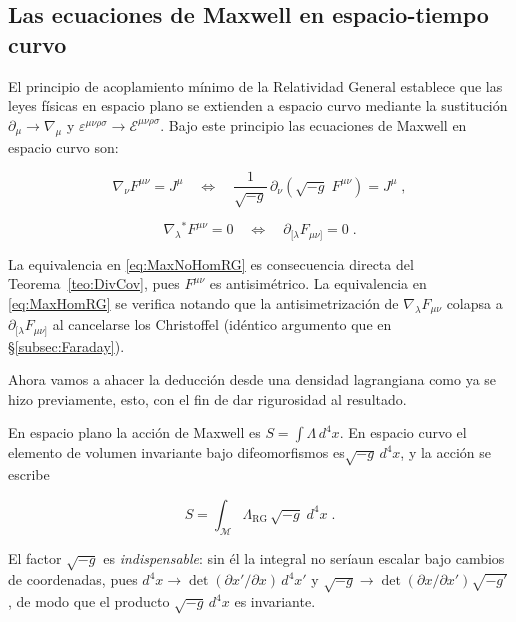         \subsection{Las ecuaciones de Maxwell en espacio-tiempo curvo}\label{subsec:MaxwellCurvo}

            El principio de acoplamiento mínimo de la Relatividad General establece que las leyes físicas en espacio plano se extienden a espacio curvo mediante la sustitución $\partial_{\mu}\to\nabla_{\mu}$ y $\varepsilon^{\mu\nu\rho\sigma} \to\mathcal{E}^{\mu\nu\rho\sigma}$.  Bajo este principio las ecuaciones de Maxwell en espacio curvo son:

            \begin{equation}\label{eq:MaxNoHomRG}
                \nabla_{\nu}F^{\mu\nu} = J^{\mu}
                \quad\Longleftrightarrow\quad
                \frac{1}{\sqrt{-g}}\,\partial_{\nu}
                \!\left(\sqrt{-g}\;F^{\mu\nu}\right) = J^{\mu}\;,
            \end{equation}

            \begin{equation}\label{eq:MaxHomRG}
                \nabla_{\lambda}{}^{*}F^{\mu\nu} = 0
                \quad\Longleftrightarrow\quad
                \partial_{[\lambda}F_{\mu\nu]} = 0\;.
            \end{equation}

            La equivalencia en \eqref{eq:MaxNoHomRG} es consecuencia directa del Teorema~\ref{teo:DivCov}, pues $F^{\mu\nu}$ es antisimétrico.  La equivalencia en \eqref{eq:MaxHomRG} se verifica notando que la antisimetrización de $\nabla_{\lambda}F_{\mu\nu}$ colapsa a $\partial_{[\lambda}F_{\mu\nu]}$ al cancelarse los Christoffel (idéntico argumento que en \S\ref{subsec:Faraday}).

            Ahora vamos a ahacer la deducción desde una densidad lagrangiana como ya se hizo previamente, esto, con el fin de dar rigurosidad al resultado.

            En espacio plano la acción de Maxwell es $S=\int\Lambda\,d^4x$. En espacio curvo el elemento de volumen invariante bajo difeomorfismos es$\sqrt{-g}\,d^4x$, y la acción se escribe

            \begin{equation}\label{eq:AccionRG}
                S = \int_{\mathcal{M}}\Lambda_{\text{RG}}\,\sqrt{-g}\;d^4x\;.
            \end{equation}

            El factor $\sqrt{-g}$ es \emph{indispensable}: sin él la integral no seríaun escalar bajo cambios de coordenadas, pues $d^4x\to\det(\partial x'/\partial x)\,d^4x'$ y $\sqrt{-g}\to\det(\partial x/\partial x')\sqrt{-g'}$, de modo que el producto $\sqrt{-g}\,d^4x$ es invariante.


